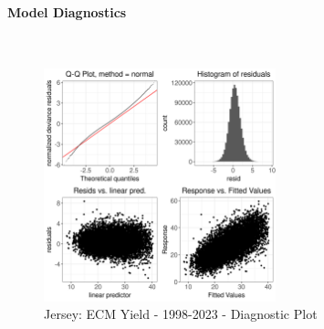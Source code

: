 \paragraph{Model Diagnostics} \quad \\
\begin{figure}[H]
    \centering
    \includegraphics[width=0.6\textwidth]{thesis/figures/models/ecm/full/je_ecm_full/je_ecm_full_diagnostics.png}
    \caption[]{Jersey: ECM Yield - 1998-2023 - Diagnostic Plot}
\end{figure}

\newpage
